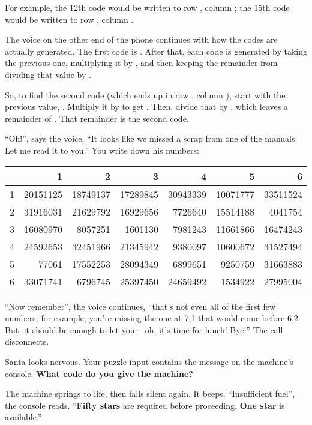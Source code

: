 For example, the 12th code would be written to row , column ; the
15th code would be written to row , column .

The voice on the other end of the phone continues with how the codes are
actually generated. The first code is . After that, each code is
generated by taking the previous one, multiplying it by , and then
keeping the remainder from dividing that value by .

So, to find the second code (which ends up in row , column ), start
with the previous value, . Multiply it by  to get
. Then, divide that by , which leaves a remainder
of . That remainder is the second code.

``Oh!'', says the voice. ``It looks like we missed a scrap from one of the
manuals. Let me read it to you.'' You write down his numbers:

\begin{table}[h]
  \centering
  \begin{tabular}{r|rrrrrr}
    & 1 & 2 & 3 & 4 & 5 & 6 \\
    \midrule
    1 & 20151125 & 18749137 & 17289845 & 30943339 & 10071777 & 33511524 \\
    2 & 31916031 & 21629792 & 16929656 & 7726640 & 15514188 & 4041754 \\
    3 &16080970 & 8057251 & 1601130 & 7981243 & 11661866 & 16474243 \\
    4 & 24592653 & 32451966 & 21345942 & 9380097 & 10600672 & 31527494 \\
    5 & 77061 & 17552253 & 28094349 & 6899651 & 9250759 & 31663883 \\
    6 & 33071741 & 6796745 & 25397450 & 24659492 & 1534922 & 27995004
  \end{tabular}
\end{table}

\newpage

``Now remember'', the voice continues, ``that's not even all of the first few
numbers; for example, you're missing the one at 7,1 that would come before
6,2. But, it should be enough to let your-- oh, it's time for lunch! Bye!'' The
call disconnects.

Santa looks nervous. Your puzzle input contains the message on the machine's
console. \textbf{What code do you give the machine?}


The machine springs to life, then falls silent again. It beeps. ``Insufficient
fuel'', the console reads. ``\textbf{Fifty stars} are required before
proceeding. \textbf{One star} is available.''


